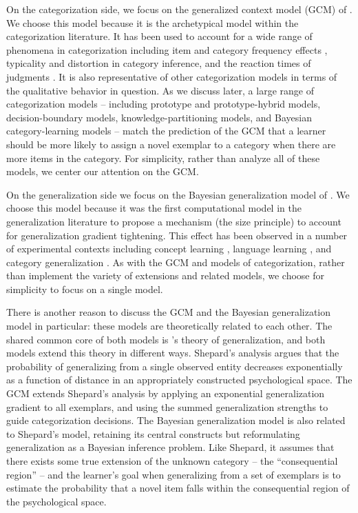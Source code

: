 \documentclass[doc,apacite]{apa6}
\newcommand{\possessivecite}[1]{\citeauthor{#1}'s \citeyear{#1}}
\begin{document}
On the categorization side, we focus on the generalized context model (GCM) of . We choose this model because it is the archetypical model within the categorization literature. 
It has been used to account for a wide range of phenomena in categorization including item and category frequency effects \cite{nosofsky1988similarity, nosofsky1991tests}, typicality \cite{nosofsky1988exemplar} and distortion \cite{zaki2007high} in category inference, and the reaction times of judgments \cite{nosofsky1997exemplar}.
It is also representative of other categorization models in terms of the qualitative behavior in question. As we discuss later, a large range of categorization models -- including prototype and prototype-hybrid models, decision-boundary models, knowledge-partitioning models, and Bayesian category-learning models --  match the prediction of the GCM that a learner should be more likely to assign a novel exemplar to a category when there are more items in the category. For simplicity, rather than analyze all of these models, we center our attention on the GCM.

On the generalization side we focus on the Bayesian generalization model of . We choose this model because it was the first computational model in the generalization literature to propose a mechanism (the size principle) to account for generalization gradient tightening.
This effect has been observed in a number of experimental contexts including concept learning \cite{tenenbaum2000rules,tenenbaum1999bayesian,sanjana2003bayesian,navarroperfors2010}, language learning \cite{xu2007word, xu2007sensitivity, hsugriffiths16,lewis2016understanding,franktenenbaum2011}, and category generalization \cite{navarro2012sampling, vong2013role}.
As with the GCM and models of categorization, rather than implement the variety of extensions and related models, we choose for simplicity to focus on a single model.

There is another reason to discuss the GCM and the Bayesian generalization model in particular: these models are theoretically related to each other. 
The shared common core of both models is \possessivecite{shepard1987universalsim} theory of generalization, and both models extend this theory in different ways. Shepard's analysis argues that the probability of generalizing from a single observed entity decreases exponentially as a function of distance in an appropriately constructed psychological space. The GCM extends Shepard's analysis by applying an exponential generalization gradient to all exemplars, and using the summed generalization strengths to guide categorization decisions. The Bayesian generalization model is also related to Shepard's model, retaining its central constructs but reformulating generalization as a Bayesian inference problem. Like Shepard, it assumes that there exists some true extension of the unknown category -- the ``consequential region'' -- and the learner's goal when generalizing from a set of exemplars is to estimate the probability that a novel item falls within the consequential region of the psychological space. 
\end{document}
